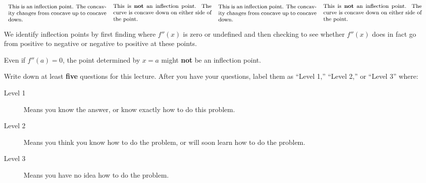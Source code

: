 \documentclass{ximera}
\begin{document}
\[\begin{array}{cccc}
\begin{minipage}{2in}\footnotesize
This is an inflection point. The concavity changes from concave up to
concave down.
\end{minipage}

& 

\begin{minipage}{2in}\footnotesize
This is \textbf{not} an inflection point. The curve is concave down on either side of the point.
\end{minipage}

& 

\begin{minipage}{2in}\footnotesize
This is an inflection point. The concavity changes from concave up to concave down.
\end{minipage}

&

\begin{minipage}{2in}\footnotesize
This is \textbf{not} an inflection point. The curve is concave down on either side of the point.
\end{minipage}

\end{array}
\]

We identify inflection points by first finding where $f''(x)$ is zero
or undefined and then checking to see whether $f''(x)$ does in fact go
from positive to negative or negative to positive at these points.

\begin{warning}
Even if $f''(a) = 0$, the point determined by $x=a$ might \textbf{not}
be an inflection point.
\end{warning}


\begin{question}
Write down at least \textbf{five} questions for this lecture. After
you have your questions, label them as ``Level 1,'' ``Level 2,'' or ``Level 3'' where:
\begin{description}
\item[Level 1] Means you know the answer, or know exactly how to do this problem.
\item[Level 2] Means you think you know how to do the problem, or will soon learn how to do the problem.
\item[Level 3] Means you have no idea how to do the problem. 
\end{description}
  \begin{freeResponse}
  \end{freeResponse}
\end{question}
\end{document}
